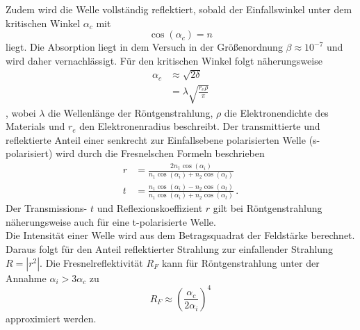 Zudem wird die Welle vollständig reflektiert, sobald der Einfallswinkel unter dem kritischen Winkel $\alpha_c$ mit
\begin{equation*}
    \cos \left ( \alpha_c \right ) = n
\end{equation*}
liegt.
Die Absorption liegt in dem Versuch in der Größenordnung $\beta \approx 10^{-7}$ und wird daher vernachlässigt.
Für den kritischen Winkel folgt näherungsweise
\begin{align}
    \alpha_c &\approx \sqrt{2 \delta} \label{eqn:kritisch_exp}\\
    &= \lambda \sqrt{\frac{r_e \rho}{\pi}} \label{eqn:kritisch_th}
\end{align}
, wobei $\lambda$ die Wellenlänge der Röntgenstrahlung, $\rho$ die Elektronendichte des Materials und $r_e$ den Elektronenradius beschreibt.
Der transmittierte und reflektierte Anteil einer senkrecht zur Einfallsebene polarisierten Welle (s-polarisiert) wird durch die Fresnelschen Formeln beschrieben
\begin{align}
    r &= \frac{2 n_1 \cos \left( \alpha_i \right)}{n_1 \cos \left( \alpha_i \right ) + n_2 \cos \left( \alpha_t \right )} \label{eqn:fresnel_r} \\
    t &= \frac{n_1 \cos \left( \alpha_i \right ) - n_2 \cos \left( \alpha_t \right )}{n_1 \cos \left( \alpha_i \right ) + n_2 \cos \left( \alpha_t \right )} \, . \label{eqn:fresnel_t}
\end{align}
Der Transmissions- $t$ und Reflexionskoeffizient $r$ gilt bei Röntgenstrahlung näherungsweise auch für eine t-polarisierte Welle.
\\
Die Intensität einer Welle wird aus dem Betragsquadrat der Feldstärke berechnet. 
Daraus folgt für den Anteil reflektierter Strahlung zur einfallender Strahlung $R = |r^2|$.
Die Fresnelreflektivität $R_F$ kann für Röntgenstrahlung unter der Annahme $\alpha_i > 3 \alpha_c$ zu
\begin{equation}
    R_F \approx \left ( \frac{\alpha_c}{2 \alpha_i} \right )^4
    \label{eqn:fresnelreflektivitaet}
\end{equation}
approximiert werden.
\FloatBarrier

